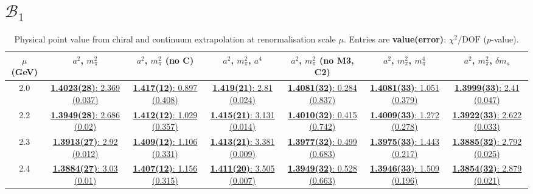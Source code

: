 \documentclass[12pt]{extarticle}
\begin{document}
\clearpage
\section{$\mathcal{B}_1$}
\begin{table}[h!]
\begin{center}
\begin{tabular}{|c|c|c|c|c|c|c|}
\hline
$\mu$ (GeV) & $a^2$, $m_\pi^2$& $a^2$, $m_\pi^2$ (no C)& $a^2$, $m_\pi^2$, $a^4$& $a^2$, $m_\pi^2$ (no M3, C2)& $a^2$, $m_\pi^2$, $m_\pi^4$& $a^2$, $m_\pi^2$, $\delta m_s$\\
\hline
2.0& \hyperlink{VVpAA/SUSY/bag_a2m2_20.pdf.1}{\textbf{1.4023(28)}: 2.369 (0.037)} & \hyperlink{VVpAA/SUSY/bag_a2m2noC_20.pdf.1}{\textbf{1.417(12)}: 0.897 (0.408)} & \hyperlink{VVpAA/SUSY/bag_a2a4m2_20.pdf.1}{\textbf{1.419(21)}: 2.81 (0.024)} & \hyperlink{VVpAA/SUSY/bag_a2m2mcut_20.pdf.1}{\textbf{1.4081(32)}: 0.284 (0.837)} & \hyperlink{VVpAA/SUSY/bag_a2m2m4_20.pdf.1}{\textbf{1.4081(33)}: 1.051 (0.379)} & \hyperlink{VVpAA/SUSY/bag_a2m2delm_20.pdf.1}{\textbf{1.3999(33)}: 2.41 (0.047)}\\
2.2& \hyperlink{VVpAA/SUSY/bag_a2m2_22.pdf.1}{\textbf{1.3949(28)}: 2.686 (0.02)} & \hyperlink{VVpAA/SUSY/bag_a2m2noC_22.pdf.1}{\textbf{1.412(12)}: 1.029 (0.357)} & \hyperlink{VVpAA/SUSY/bag_a2a4m2_22.pdf.1}{\textbf{1.415(21)}: 3.131 (0.014)} & \hyperlink{VVpAA/SUSY/bag_a2m2mcut_22.pdf.1}{\textbf{1.4010(32)}: 0.415 (0.742)} & \hyperlink{VVpAA/SUSY/bag_a2m2m4_22.pdf.1}{\textbf{1.4009(33)}: 1.272 (0.278)} & \hyperlink{VVpAA/SUSY/bag_a2m2delm_22.pdf.1}{\textbf{1.3922(33)}: 2.622 (0.033)}\\
2.3& \hyperlink{VVpAA/SUSY/bag_a2m2_23.pdf.1}{\textbf{1.3913(27)}: 2.92 (0.012)} & \hyperlink{VVpAA/SUSY/bag_a2m2noC_23.pdf.1}{\textbf{1.409(12)}: 1.106 (0.331)} & \hyperlink{VVpAA/SUSY/bag_a2a4m2_23.pdf.1}{\textbf{1.413(21)}: 3.381 (0.009)} & \hyperlink{VVpAA/SUSY/bag_a2m2mcut_23.pdf.1}{\textbf{1.3977(32)}: 0.499 (0.683)} & \hyperlink{VVpAA/SUSY/bag_a2m2m4_23.pdf.1}{\textbf{1.3975(33)}: 1.443 (0.217)} & \hyperlink{VVpAA/SUSY/bag_a2m2delm_23.pdf.1}{\textbf{1.3885(32)}: 2.792 (0.025)}\\
2.4& \hyperlink{VVpAA/SUSY/bag_a2m2_24.pdf.1}{\textbf{1.3884(27)}: 3.03 (0.01)} & \hyperlink{VVpAA/SUSY/bag_a2m2noC_24.pdf.1}{\textbf{1.407(12)}: 1.156 (0.315)} & \hyperlink{VVpAA/SUSY/bag_a2a4m2_24.pdf.1}{\textbf{1.411(20)}: 3.505 (0.007)} & \hyperlink{VVpAA/SUSY/bag_a2m2mcut_24.pdf.1}{\textbf{1.3949(32)}: 0.528 (0.663)} & \hyperlink{VVpAA/SUSY/bag_a2m2m4_24.pdf.1}{\textbf{1.3946(33)}: 1.509 (0.196)} & \hyperlink{VVpAA/SUSY/bag_a2m2delm_24.pdf.1}{\textbf{1.3854(32)}: 2.879 (0.021)}\\
\hline
\end{tabular}
\caption{Physical point value from chiral and continuum extrapolation at renormalisation scale $\mu$. Entries are \textbf{value(error)}: $\chi^2/\text{DOF}$ ($p$-value).}
\end{center}
\end{table}
\end{document}
